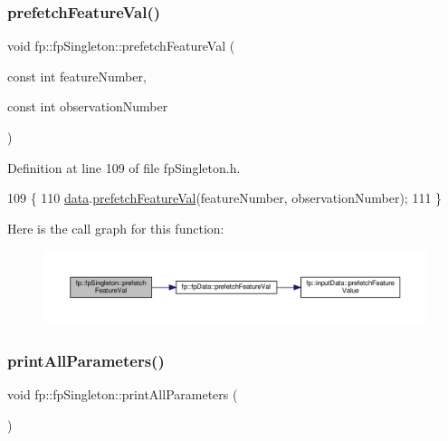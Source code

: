 \subsubsection{\texorpdfstring{prefetch\+Feature\+Val()}{prefetchFeatureVal()}}
{\footnotesize\ttfamily void fp\+::fp\+Singleton\+::prefetch\+Feature\+Val (\begin{DoxyParamCaption}\item[{const int}]{feature\+Number,  }\item[{const int}]{observation\+Number }\end{DoxyParamCaption})\hspace{0.3cm}{\ttfamily [inline]}}



Definition at line 109 of file fp\+Singleton.\+h.


\begin{DoxyCode}
109                                                                                                 \{
110                 \hyperlink{classfp_1_1fpSingleton_a2fa16ac6a0f66641749032eeee61b8e9}{data}.\hyperlink{classfp_1_1fpData_a3f9645ca93e9b64a788b3042e9e41fcc}{prefetchFeatureVal}(featureNumber, observationNumber);
111             \}
\end{DoxyCode}
Here is the call graph for this function\+:
\nopagebreak
\begin{figure}[H]
\begin{center}
\leavevmode
\includegraphics[width=350pt]{classfp_1_1fpSingleton_ab789c4e4bfb3248711a5857015008f8d_cgraph}
\end{center}
\end{figure}
\mbox{\label{classfp_1_1fpSingleton_a0d769b6652e4c74c2734cdc811eeab5a}} 
\subsubsection{\texorpdfstring{print\+All\+Parameters()}{printAllParameters()}}
{\footnotesize\ttfamily void fp\+::fp\+Singleton\+::print\+All\+Parameters (\begin{DoxyParamCaption}{ }\end{DoxyParamCaption})\hspace{0.3cm}{\ttfamily [inline]}}



